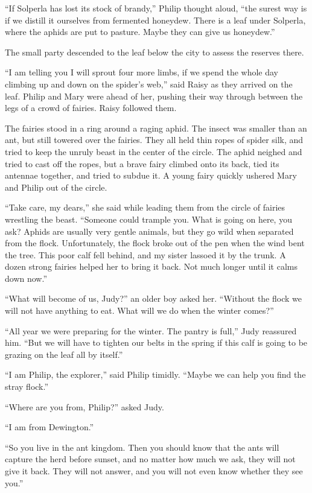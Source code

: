 \documentclass[10pt, draft]{memoir}
\begin{document}
``If Solperla has lost its stock of brandy,'' Philip thought aloud, ``the
surest way is if we distill it ourselves from fermented honeydew. There is a
leaf under Solperla, where the aphids are put to pasture. Maybe they can give
us honeydew.''

The small party descended to the leaf below the city to assess the reserves
there.

``I am telling you I will sprout four more limbs, if we spend the whole day
climbing up and down on the spider's web,'' said Raisy as they arrived on the
leaf. Philip and Mary were ahead of her, pushing their way through between the
legs of a crowd of fairies. Raisy followed them.

The fairies stood in a ring around a raging aphid. The insect was smaller than
an ant, but still towered over the fairies. They all held thin ropes of spider
silk, and tried to keep the unruly beast in the center of the circle. The aphid
neighed and tried to cast off the ropes, but a brave fairy climbed onto its
back, tied its antennae together, and tried to subdue it. A young fairy quickly
ushered Mary and Philip out of the circle.

``Take care, my dears,'' she said while leading them from the circle of fairies
wrestling the beast. ``Someone could trample you. What is going on here, you
ask? Aphids are usually very gentle animals, but they go wild when separated
from the flock. Unfortunately, the flock broke out of the pen when the wind
bent the tree. This poor calf fell behind, and my sister lassoed it by the
trunk. A dozen strong fairies helped her to bring it back. Not much longer
until it calms down now.'' 

``What will become of us, Judy?'' an older boy asked her. ``Without the flock
we will not  have anything to eat. What will we do when the winter comes?''

``All year we were preparing for the winter. The pantry is full,'' Judy
reassured him. ``But we will have to tighten our belts in the spring if this
calf is going to be grazing on the leaf all by itself.''

``I am Philip, the explorer,'' said Philip timidly. ``Maybe we can help you
find the stray flock.''

``Where are you from, Philip?'' asked Judy.

``I am from Dewington.''

``So you live in the ant kingdom. Then you should know that the ants will
capture the herd before sunset, and no matter how much we ask, they will not
give it back. They will not answer, and you will not even know whether they see
you.''
\end{document}
